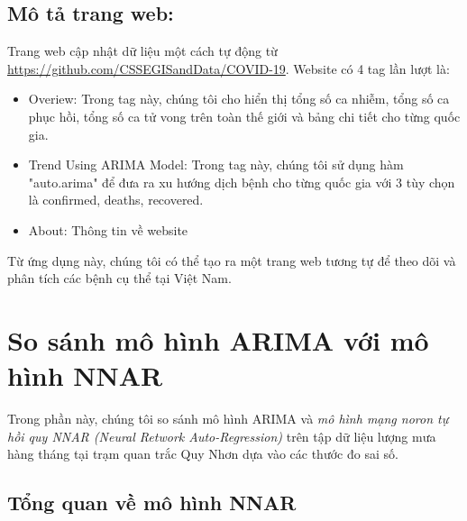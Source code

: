 \documentclass[12pt, a4paper,oneside]{book}
\theoremstyle{definition}
\begin{document}
\subsection*{Mô tả trang web:}
Trang web cập nhật dữ liệu một cách tự động từ \url{https://github.com/CSSEGISandData/COVID-19}. Website có 4 tag lần lượt là:
\begin{itemize}
	\item Overiew: Trong tag này, chúng tôi cho hiển thị tổng số ca nhiễm, tổng số ca phục hồi, tổng số ca tử vong trên toàn thế giới và bảng chi tiết cho từng quốc gia.
	\item Trend Using ARIMA Model: Trong tag này, chúng tôi sử dụng hàm "auto.arima" để đưa ra xu hướng dịch bệnh cho từng quốc gia với 3 tùy chọn là confirmed, deaths, recovered.
	\item About: Thông tin về website
\end{itemize}
Từ ứng dụng này, chúng tôi có thể tạo ra một trang web tương tự để theo dõi và phân tích các bệnh cụ thể tại Việt Nam.

\section{So sánh mô hình ARIMA với mô hình NNAR}
Trong phần này, chúng tôi so sánh mô hình ARIMA và \textit{mô hình mạng noron tự hồi quy NNAR (Neural Retwork Auto-Regression)} trên tập dữ liệu lượng mưa hàng tháng tại trạm quan trắc Quy Nhơn dựa vào các thước đo sai số.
\subsection*{Tổng quan về mô hình NNAR}
\end{document}
